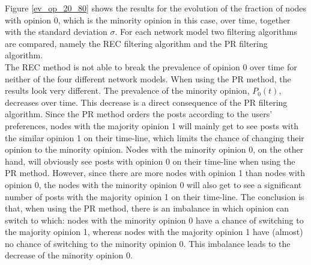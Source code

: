 \documentclass[11 pt , letterpaper , twoside , openright]{book}
\begin{document}
Figure \ref{ev_op_20_80} shows the results for the evolution of the fraction of nodes with opinion 0, which is the minority opinion in this case, over time, together with the standard deviation $\sigma$. For each network model two filtering algorithms are compared, namely the REC filtering algorithm and the PR filtering algorithm. \\
The REC method is not able to break the prevalence of opinion 0 over time for neither of the four different network models. When using the PR method, the results look very different. The prevalence of the minority opinion, $P_0(t)$, decreases over time. This decrease is a direct consequence of the PR filtering algorithm. Since the PR method orders the posts according to the users' preferences, nodes with the majority opinion 1 will mainly get to see posts with the similar opinion 1 on their time-line, which limits the chance of changing their opinion to the minority opinion. Nodes with the minority opinion 0, on the other hand, will obviously see posts with opinion 0 on their time-line when using the PR method. However, since there are more nodes with opinion 1 than nodes with opinion 0, the nodes with the minority opinion 0 will also get to see a significant number of posts with the majority opinion 1 on their time-line. The conclusion is that, when using the PR method, there is an imbalance in which opinion can switch to which: nodes with the minority opinion 0 have a chance of switching to the majority opinion 1, whereas nodes with the majority opinion 1 have (almost) no chance of switching to the minority opinion 0. This imbalance leads to the decrease of the minority opinion 0.\\
\newpage
\noindent
\end{document}
